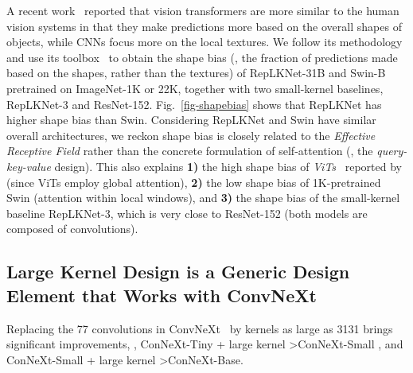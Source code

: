 \documentclass[10pt,twocolumn,letterpaper]{article}
\begin{document}
	A recent work~\cite{tuli2021convolutional} reported that vision transformers are more similar to the human vision systems in that they make predictions more based on the overall shapes of objects, while CNNs focus more on the local textures. We follow its methodology and use its toolbox~\cite{modelvshuman} to obtain the shape bias (\eg, the fraction of predictions made based on the shapes, rather than the textures) of RepLKNet-31B and Swin-B pretrained on ImageNet-1K or 22K, together with two small-kernel baselines, RepLKNet-3 and ResNet-152. Fig.~\ref{fig-shapebias} shows that RepLKNet has higher shape bias than Swin. Considering RepLKNet and Swin have similar overall architectures, we reckon shape bias is closely related to the \emph{Effective Receptive Field} rather than the concrete formulation of self-attention (\ie, the \emph{query-key-value} design). This also explains \textbf{1)} the high shape bias of \emph{ViTs}~\cite{vit} reported by \cite{tuli2021convolutional} (since ViTs employ global attention), \textbf{2)} the low shape bias of 1K-pretrained Swin (attention within local windows), and \textbf{3)} the shape bias of the small-kernel baseline RepLKNet-3, which is very close to ResNet-152 (both models are composed of  convolutions). 
	
	

	\subsection{Large Kernel Design is a Generic Design Element that Works with ConvNeXt} Replacing the 77 convolutions in ConvNeXt~\cite{liu2022convnet} by kernels as large as 3131 brings significant improvements, \eg, ConNeXt-Tiny + large kernel \textgreater ConNeXt-Small , and ConNeXt-Small + large kernel \textgreater ConNeXt-Base. 
	
\end{document}
